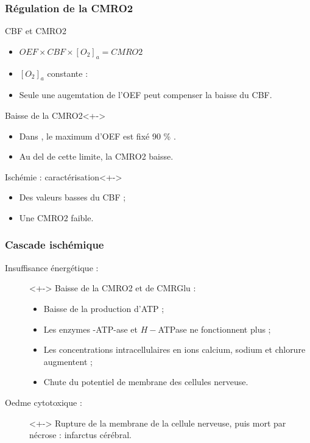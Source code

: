 
\begin{frame}
\frametitle{R\'egulation de la CMRO2}
\begin{block}{CBF et CMRO2}
\begin{itemize}
\item $OEF\times CBF\times [O_2]_a=CMRO2$
\item<+-> $[O_2]_a$ constante :
\item<+-> Seule une augemtation de l'OEF peut compenser la baisse du CBF.
\end{itemize}
\end{block}
\end{frame}

\begin{frame}
%
\begin{block}{Baisse de la CMRO2}<+->
\begin{itemize}
\item<+-> Dans \cite{Duval_JCBFM_02}, le maximum d'OEF est fix\'e  90 \% .
\item<+-> Au del de cette limite, la CMRO2 baisse.
\end{itemize}
\end{block}

\begin{block}{Isch\'emie : caract\'erisation}<+->
\begin{itemize}
\item<+-> Des valeurs basses du CBF ;
\item<+-> Une CMRO2 faible.
\end{itemize}
\end{block}
%
\end{frame}




\begin{frame}
\frametitle{Cascade isch\'emique}
\begin{description}
\item[Insuffisance \'energ\'etique :]<+-> Baisse de la CMRO2 et de CMRGlu :
\begin{itemize}
\item<+-> Baisse de la production d'ATP ;
\item<+-> Les enzymes -ATP-ase et $H-$ATPase ne fonctionnent plus ;
\item<+-> Les concentrations intracellulaires en ions calcium, sodium et chlorure augmentent ;
\item<+-> Chute du potentiel de membrane des cellules nerveuse.
\end{itemize}
%
\item[Oedme cytotoxique :]<+-> Rupture de la membrane de la cellule nerveuse, puis mort par n\'ecrose : infarctus c\'er\'ebral.
\end{description}
\end{frame}

